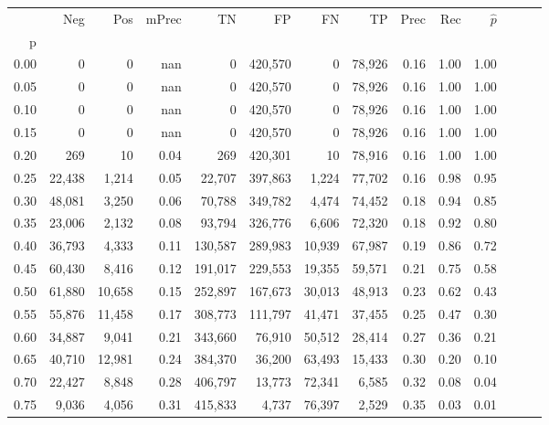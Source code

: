 \begin{tabular}{rrrrrrrrrrrrrr}
\toprule
{} &     Neg &     Pos & mPrec &       TN &       FP &      FN &      TP &  Prec &   Rec & $\hat{p}$ \\
p    &         &         &       &          &          &         &         &       &       &           \\
\midrule
0.00 &       0 &       0 &   nan &        0 &  420,570 &       0 &  78,926 &  0.16 &  1.00 &      1.00 \\
0.05 &       0 &       0 &   nan &        0 &  420,570 &       0 &  78,926 &  0.16 &  1.00 &      1.00 \\
0.10 &       0 &       0 &   nan &        0 &  420,570 &       0 &  78,926 &  0.16 &  1.00 &      1.00 \\
0.15 &       0 &       0 &   nan &        0 &  420,570 &       0 &  78,926 &  0.16 &  1.00 &      1.00 \\
0.20 &     269 &      10 &  0.04 &      269 &  420,301 &      10 &  78,916 &  0.16 &  1.00 &      1.00 \\
0.25 &  22,438 &   1,214 &  0.05 &   22,707 &  397,863 &   1,224 &  77,702 &  0.16 &  0.98 &      0.95 \\
0.30 &  48,081 &   3,250 &  0.06 &   70,788 &  349,782 &   4,474 &  74,452 &  0.18 &  0.94 &      0.85 \\
0.35 &  23,006 &   2,132 &  0.08 &   93,794 &  326,776 &   6,606 &  72,320 &  0.18 &  0.92 &      0.80 \\
0.40 &  36,793 &   4,333 &  0.11 &  130,587 &  289,983 &  10,939 &  67,987 &  0.19 &  0.86 &      0.72 \\
0.45 &  60,430 &   8,416 &  0.12 &  191,017 &  229,553 &  19,355 &  59,571 &  0.21 &  0.75 &      0.58 \\
0.50 &  61,880 &  10,658 &  0.15 &  252,897 &  167,673 &  30,013 &  48,913 &  0.23 &  0.62 &      0.43 \\
0.55 &  55,876 &  11,458 &  0.17 &  308,773 &  111,797 &  41,471 &  37,455 &  0.25 &  0.47 &      0.30 \\
0.60 &  34,887 &   9,041 &  0.21 &  343,660 &   76,910 &  50,512 &  28,414 &  0.27 &  0.36 &      0.21 \\
0.65 &  40,710 &  12,981 &  0.24 &  384,370 &   36,200 &  63,493 &  15,433 &  0.30 &  0.20 &      0.10 \\
0.70 &  22,427 &   8,848 &  0.28 &  406,797 &   13,773 &  72,341 &   6,585 &  0.32 &  0.08 &      0.04 \\
0.75 &   9,036 &   4,056 &  0.31 &  415,833 &    4,737 &  76,397 &   2,529 &  0.35 &  0.03 &      0.01 \\

\end{tabular}
